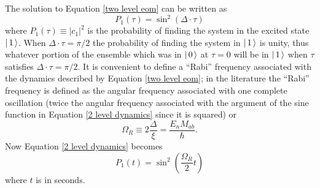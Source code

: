 The solution to Equation \ref{two level eom} can be written as
\begin{equation}
P_1(\tau)
=
\sin^2(\Delta\cdot\tau)
\label{2 level dynamics}
\end{equation}
where $P_1(\tau)\equiv|c_1|^2$ is the probability of finding the system in the excited state $\left| \hspace{0.15em} 1 \hspace{0.15em}\right\rangle$. When $\Delta\cdot\tau=\pi/2$ the probability of finding the system in $\left| \hspace{0.15em} 1 \hspace{0.15em}\right\rangle$ is unity, thus whatever portion of the ensemble which was in $\left| \hspace{0.15em} 0 \hspace{0.15em}\right\rangle$ at $\tau=0$ will be in $\left| \hspace{0.15em} 1 \hspace{0.15em}\right\rangle$ when $\tau$ satisfies $\Delta\cdot\tau=\pi/2$. It is convenient to define a ``Rabi'' frequency associated with the dynamics described by Equation \ref{two level eom}; in the literature the ``Rabi'' frequency is defined as the angular frequency associated with one complete oscillation (twice the angular frequency associated with the argument of the sine function in Equation \ref{2 level dynamics} since it is squared) or
\begin{equation}
\Omega_R
\equiv
2\frac{
\Delta
}{\xi}
=
\frac{
E_n M_{ab}
}{
\hbar}.
\end{equation}
Now Equation \ref{2 level dynamics} becomes
\begin{equation}
\boxed{
P_1(t)
=
\sin^2
\left(
\frac{\Omega_R}{2}t
\right)
\label{2 level dynamics normal}
}
\end{equation}
where $t$ is in seconds.


